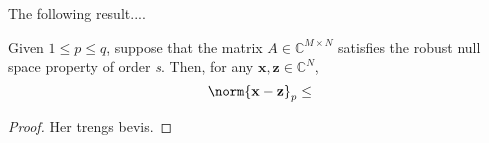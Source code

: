 The following result....

\begin{theorem}
Given $1 \leq p \leq q$, suppose that the matrix $A \in \mathbb{C}^{M \times N}$ satisfies the robust null space property of order \emph{s}. Then, for any $\mathbf{x}, \mathbf{z} \in \mathbb{C}^{N}$, 
\begin{equation*}
\norm{\mathbf{x-z}}_{p} \leq 
\end{equation*}

\end{theorem}

\begin{proof}
Her trengs bevis.
\end{proof}
